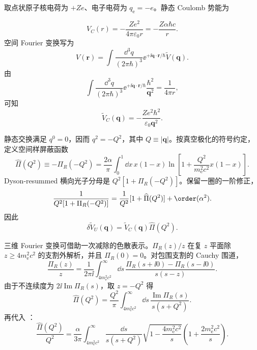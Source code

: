 \begin{derivation}[真空极化怎样修正静态势能]
取点状原子核电荷为 $+Ze$、电子电荷为 $q_{\mathrm e}=-e$。静态 Coulomb 势能为

\begin{equation*}
 V_C(r)=-\frac{Ze^2}{4\pi\varepsilon_0r}
 =-\frac{Z\alpha\hbar c}{r}.
 \end{equation*}
空间 Fourier 变换写为
\begin{equation*}
 V(\mathbf r)
 =\int\frac{\dd^3 q}{(2\pi\hbar)^3}
 \ee^{+\ii\mathbf q\cdot\mathbf r/\hbar}
 \widetilde V(\mathbf q).
 \end{equation*}
由
\begin{equation*}
 \int\frac{\dd^3 q}{(2\pi\hbar)^3}
 \ee^{+\ii\mathbf q\cdot\mathbf r/\hbar}
 \frac{\hbar^2}{\mathbf q^2}
 =\frac1{4\pi r},
\end{equation*}
可知
\begin{equation*}
 \widetilde V_C(\mathbf q)
 =-\frac{Ze^2\hbar^2}{\varepsilon_0\mathbf q^2}.
 \end{equation*}

静态交换满足 $q^0=0$，因而 $q^2=-Q^2$，其中 $Q\equiv|\mathbf q|$。按真空极化的符号约定，定义空间样屏蔽函数
\begin{equation*}
 \widehat\Pi(Q^2)
 \equiv-\Pi_R(-Q^2)
 =\frac{2\alpha}{\pi}
 \int_0^1\dd x\,x(1-x)
 \ln\left[1+\frac{Q^2}{m_{\mathrm e}^2c^2}x(1-x)\right].
 \end{equation*}
Dyson-resummed 横向光子分母是 $Q^2[1+\Pi_R(-Q^2)]$。保留一圈的一阶修正，
\begin{equation*}
 \frac1{Q^2[1+\Pi_R(-Q^2)]}
 =\frac1{Q^2}[1+\widehat\Pi(Q^2)]+
 \order(\alpha^2).
\end{equation*}
因此
\begin{equation*}
 \delta\widetilde V_U(\mathbf q)
 =\widetilde V_C(\mathbf q)\widehat\Pi(Q^2).
 \end{equation*}

三维 Fourier 变换可借助一次减除的色散表示。$\Pi_R(z)/z$ 在复 $z$ 平面除 $z\ge4m_{\mathrm e}^2c^2$ 的支割外解析，并且 $\Pi_R(0)=0$。对包围支割的 Cauchy 围道，
\begin{equation*}
 \frac{\Pi_R(z)}{z}
 =\frac1{2\pi\ii}
 \int_{4m_{\mathrm e}^2c^2}^{\infty}\dd s\,
 \frac{\Pi_R(s+\ii0)-\Pi_R(s-\ii0)}{s(s-z)}.
\end{equation*}
由于不连续度为 $2\ii\operatorname{Im}\Pi_R(s)$，取 $z=-Q^2$ 得
\begin{equation*}
 \widehat\Pi(Q^2)
 =\frac{Q^2}{\pi}
 \int_{4m_{\mathrm e}^2c^2}^{\infty}\dd s\,
 \frac{\operatorname{Im}\Pi_R(s)}{s(s+Q^2)}.
 \end{equation*}
再代入 ：
\begin{equation*}
 \frac{\widehat\Pi(Q^2)}{Q^2}
 =\frac{\alpha}{3\pi}
 \int_{4m_{\mathrm e}^2c^2}^{\infty}\frac{\dd s}{s(s+Q^2)}
 \sqrt{1-\frac{4m_{\mathrm e}^2c^2}{s}}
 \left(1+\frac{2m_{\mathrm e}^2c^2}{s}\right).
 \end{equation*}


\end{derivation}
